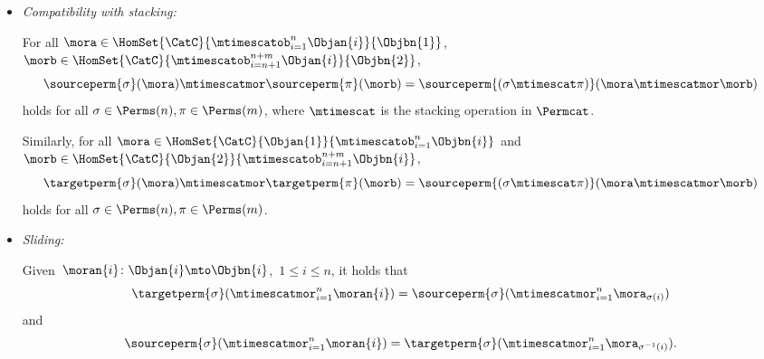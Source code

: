 \begin{ctdefinition}
\begin{itemize}
        \item \emph{Compatibility with stacking:}

              For all $\mora \in \HomSet{\CatC}{\mtimescatob_{i=1}^n \Objan{i}}{\Objbn{1}}$, $\morb \in \HomSet{\CatC}{\mtimescatob_{i=n+1}^{n+m} \Objan{i}}{\Objbn{2}}$,
              \begin{equation}
                  \sourceperm{\sigma}(\mora) \mtimescatmor \sourceperm{\pi}(\morb) =  \sourceperm{(\sigma \mtimescat \pi)}(\mora \mtimescatmor \morb)
              \end{equation}
              holds for all $\sigma \in \Perms(n), \pi \in \Perms(m)$, where $\mtimescat$ is the stacking operation in $\Permcat$.

              Similarly, for all $\mora \in \HomSet{\CatC}{\Objan{1}}{\mtimescatob_{i=1}^n \Objbn{i}} $ and $\morb \in \HomSet{\CatC}{\Objan{2}}{\mtimescatob_{i=n+1}^{n+m} \Objbn{i}}$,
              \begin{equation}
                  \targetperm{\sigma}(\mora) \mtimescatmor \targetperm{\pi}(\morb) =  \sourceperm{(\sigma \mtimescat \pi)}(\mora \mtimescatmor \morb)
              \end{equation}
              holds for all $\sigma \in \Perms(n), \pi \in \Perms(m)$.

        \item \emph{Sliding:}

              Given~$\moran{i} \colon \Objan{i} \mto \Objbn{i}$,~$1 \leq i \leq n$, it holds that
              \begin{equation}
                  \label{eq:perm-compatibility-with-stacking-1}
                  \targetperm{\sigma} ( \mtimescatmor_{i=1}^n \moran{i} ) = \sourceperm{\sigma}( \mtimescatmor_{i=1}^n \mora_{\sigma(i)} )
              \end{equation}
              and
              \begin{equation}
                  \label{eq:perm-compatibility-with-stacking-2}
                  \sourceperm{\sigma} ( \mtimescatmor_{i=1}^n \moran{i} ) = \targetperm{\sigma} ( \mtimescatmor_{i=1}^n \mora_{\sigma^{-1}(i)} ).
              \end{equation}

    \end{itemize}
\end{ctdefinition}



